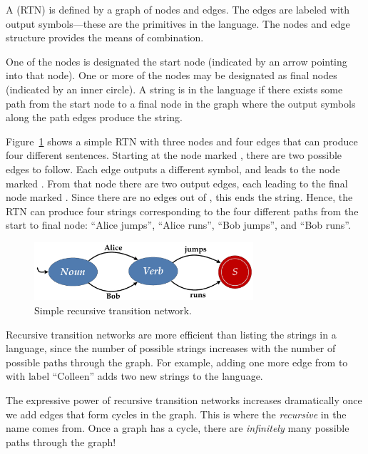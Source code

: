 A  (RTN) is defined by a graph of nodes and edges.  The edges are labeled with output symbols---these are the primitives in the language.  The nodes and edge structure provides the means of combination.

One of the nodes is designated the start node (indicated by an arrow pointing into that node).  One or more of the nodes may be designated as final nodes (indicated by an inner circle).  A string is in the language if there exists some path from the start node to a final node in the graph where the output symbols along the path edges produce the string.

Figure~\ref{fig:simple-rtn} shows a simple RTN with three nodes and four edges that can produce four different sentences.  Starting at the node marked , there are two possible edges to follow.  Each edge outputs a different symbol, and leads to the node marked .  From that node there are two output edges, each leading to the final node marked .  Since there are no edges out of , this ends the string.  Hence, the RTN can produce four strings corresponding to the four different paths from the start to final node: ``Alice jumps'', ``Alice runs'', ``Bob jumps'', and ``Bob runs''.  

\begin{figure}[b]
\begin{center}
\includegraphics[height=0.85in]{figures/simple-rtn.pdf}
\caption{Simple recursive transition network.}\label{fig:simple-rtn}
\end{center}
\end{figure}

Recursive transition networks are more efficient than listing the strings in a language, since the number of possible strings increases with the number of possible paths through the graph.  For example, adding one more edge from  to  with label ``Colleen'' adds two new strings to the language.  

The expressive power of recursive transition networks increases dramatically once we add edges that form cycles in the graph.  This is where the \emph{recursive} in the name comes from. Once a graph has a cycle, there are \emph{infinitely} many possible paths through the graph!

